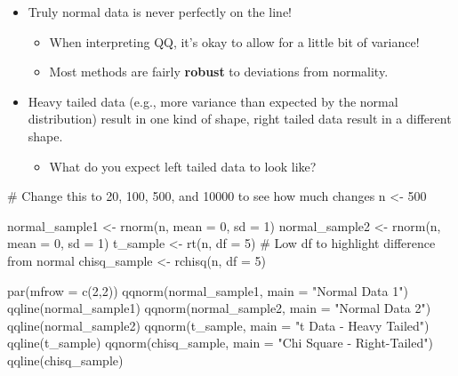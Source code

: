 \documentclass[
  letterpaper,
  DIV=11,
  numbers=noendperiod]{scrreprt}
\newenvironment{Shaded}{\begin{snugshade}}{\end{snugshade}}
\newcommand{\AttributeTok}[1]{\textcolor[rgb]{0.40,0.45,0.13}{#1}}
\newcommand{\CommentTok}[1]{\textcolor[rgb]{0.37,0.37,0.37}{#1}}
\newcommand{\DecValTok}[1]{\textcolor[rgb]{0.68,0.00,0.00}{#1}}
\newcommand{\FunctionTok}[1]{\textcolor[rgb]{0.28,0.35,0.67}{#1}}
\newcommand{\NormalTok}[1]{\textcolor[rgb]{0.00,0.23,0.31}{#1}}
\newcommand{\OtherTok}[1]{\textcolor[rgb]{0.00,0.23,0.31}{#1}}
\newcommand{\StringTok}[1]{\textcolor[rgb]{0.13,0.47,0.30}{#1}}
\providecommand{\tightlist}{%
  \setlength{\itemsep}{0pt}\setlength{\parskip}{0pt}}\usepackage{longtable,booktabs,array}
\begin{document}
\begin{itemize}
\tightlist
\item
  Truly normal data is never perfectly on the line!

  \begin{itemize}
  \tightlist
  \item
    When interpreting QQ, it's okay to allow for a little bit of
    variance!
  \item
    Most methods are fairly \textbf{robust} to deviations from
    normality.
  \end{itemize}
\item
  Heavy tailed data (e.g., more variance than expected by the normal
  distribution) result in one kind of shape, right tailed data result in
  a different shape.

  \begin{itemize}
  \tightlist
  \item
    What do you expect left tailed data to look like?
  \end{itemize}
\end{itemize}

\begin{Shaded}
\begin{Highlighting}[]
\CommentTok{\# Change this to 20, 100, 500, and 10000 to see how much changes}
\NormalTok{n }\OtherTok{\textless{}{-}} \DecValTok{500}

\NormalTok{normal\_sample1 }\OtherTok{\textless{}{-}} \FunctionTok{rnorm}\NormalTok{(n, }\AttributeTok{mean =} \DecValTok{0}\NormalTok{, }\AttributeTok{sd =} \DecValTok{1}\NormalTok{)}
\NormalTok{normal\_sample2 }\OtherTok{\textless{}{-}} \FunctionTok{rnorm}\NormalTok{(n, }\AttributeTok{mean =} \DecValTok{0}\NormalTok{, }\AttributeTok{sd =} \DecValTok{1}\NormalTok{)}
\NormalTok{t\_sample }\OtherTok{\textless{}{-}} \FunctionTok{rt}\NormalTok{(n, }\AttributeTok{df =} \DecValTok{5}\NormalTok{) }\CommentTok{\# Low df to highlight difference from normal}
\NormalTok{chisq\_sample }\OtherTok{\textless{}{-}} \FunctionTok{rchisq}\NormalTok{(n, }\AttributeTok{df =} \DecValTok{5}\NormalTok{)}

\FunctionTok{par}\NormalTok{(}\AttributeTok{mfrow =} \FunctionTok{c}\NormalTok{(}\DecValTok{2}\NormalTok{,}\DecValTok{2}\NormalTok{))}
\FunctionTok{qqnorm}\NormalTok{(normal\_sample1, }\AttributeTok{main =} \StringTok{"Normal Data 1"}\NormalTok{)}
\FunctionTok{qqline}\NormalTok{(normal\_sample1)}
\FunctionTok{qqnorm}\NormalTok{(normal\_sample2, }\AttributeTok{main =} \StringTok{"Normal Data 2"}\NormalTok{)}
\FunctionTok{qqline}\NormalTok{(normal\_sample2)}
\FunctionTok{qqnorm}\NormalTok{(t\_sample, }\AttributeTok{main =} \StringTok{"t Data {-} Heavy Tailed"}\NormalTok{)}
\FunctionTok{qqline}\NormalTok{(t\_sample)}
\FunctionTok{qqnorm}\NormalTok{(chisq\_sample, }\AttributeTok{main =} \StringTok{"Chi Square {-} Right{-}Tailed"}\NormalTok{)}
\FunctionTok{qqline}\NormalTok{(chisq\_sample)}
\end{Highlighting}
\end{Shaded}
\end{document}
